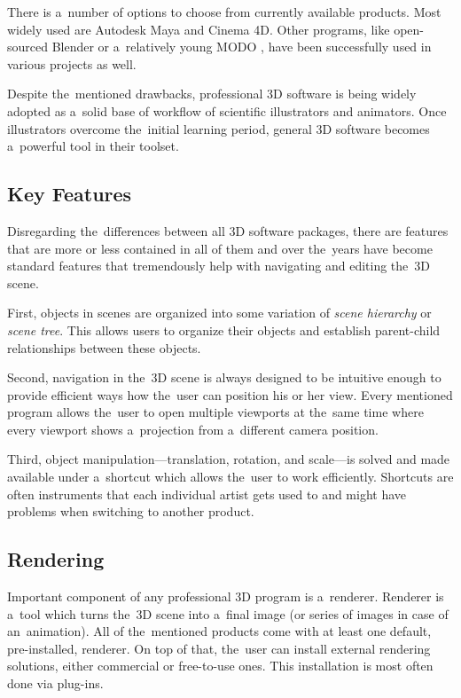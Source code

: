 \documentclass[
  digital, %
  table,   %
  nolof,     %
  nolot,     %
  oneside,
]{fithesis3}
\begin{document}
There is a number of options to choose from currently available products. Most widely used are Autodesk Maya and Cinema 4D. Other programs, like open-sourced Blender or a relatively young MODO \cite{MODOscientificIll}, have been successfully used in various projects as well.

Despite the mentioned drawbacks, professional 3D software is being widely adopted as a solid base of workflow of scientific illustrators and animators. Once illustrators overcome the initial learning period, general 3D software becomes a powerful tool in their toolset. 

\subsection{Key Features}
Disregarding the differences between all 3D software packages, there are features that are more or less contained in all of them and over the years have become standard features that tremendously help with navigating and editing the 3D scene.

First, objects in scenes are organized into some variation of \textit{scene hierarchy} or \textit{scene tree}. This allows users to organize their objects and establish parent-child relationships between these objects.

Second, navigation in the 3D scene is always designed to be intuitive enough to provide efficient ways how the user can position his or her view. Every mentioned program allows the user to open multiple viewports at the same time where every viewport shows a projection from a different camera position.

Third, object manipulation—translation, rotation, and scale—is solved and made available under a shortcut which allows the user to work efficiently. Shortcuts are often instruments that each individual artist gets used to and might have problems when switching to another product.

\subsection{Rendering}
Important component of any professional 3D program is a renderer. Renderer is a tool which turns the 3D scene into a final image (or series of images in case of an animation). All of the mentioned products come with at least one default, pre-installed, renderer. On top of that, the user can install external rendering solutions, either commercial or free-to-use ones. This installation is most often done via plug-ins.
\end{document}
